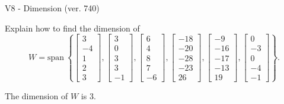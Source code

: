 \begin{exercise}
  \begin{exerciseTitle}V8 - Dimension (ver. 740)\end{exerciseTitle}
  \begin{exerciseStatement}
    Explain how to find the dimension of 
\[W=\mathrm{span}\ \left\{\left[\begin{array}{r}
3 \\
-4 \\
1 \\
2 \\
3
\end{array}\right] , \left[\begin{array}{r}
3 \\
0 \\
3 \\
3 \\
-1
\end{array}\right] , \left[\begin{array}{r}
6 \\
4 \\
8 \\
7 \\
-6
\end{array}\right] , \left[\begin{array}{r}
-18 \\
-20 \\
-28 \\
-23 \\
26
\end{array}\right] , \left[\begin{array}{r}
-9 \\
-16 \\
-17 \\
-13 \\
19
\end{array}\right] , \left[\begin{array}{r}
0 \\
-3 \\
0 \\
-4 \\
-1
\end{array}\right]\right\}.\]



  \end{exerciseStatement}
  \begin{exerciseAnswer}
   The dimension of \(W\) is  \(3\).
  


  \end{exerciseAnswer}
\end{exercise}